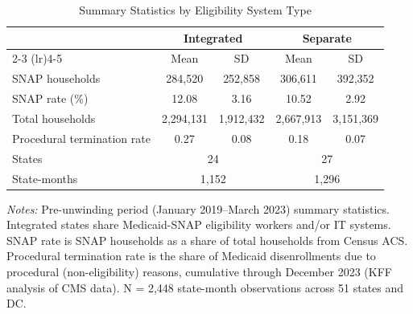 \begin{table}[H]
\centering
\caption{Summary Statistics by Eligibility System Type}
\label{tab:summary}
\begin{threeparttable}
\begin{tabular}{lcccc}
\toprule
 & \multicolumn{2}{c}{Integrated} & \multicolumn{2}{c}{Separate} \\
\cmidrule(lr){2-3} \cmidrule(lr){4-5}
 & Mean & SD & Mean & SD \\
\midrule
SNAP households & 284,520 & 252,858 & 306,611 & 392,352 \\
SNAP rate (\%) & 12.08 & 3.16 & 10.52 & 2.92 \\
Total households & 2,294,131 & 1,912,432 & 2,667,913 & 3,151,369 \\
Procedural termination rate & 0.27 & 0.08 & 0.18 & 0.07 \\
\midrule
States & \multicolumn{2}{c}{24} & \multicolumn{2}{c}{27} \\
State-months & \multicolumn{2}{c}{1,152} & \multicolumn{2}{c}{1,296} \\
\bottomrule
\end{tabular}
\begin{tablenotes}[flushleft]
\small
\item \textit{Notes:} Pre-unwinding period (January 2019--March 2023) summary statistics. 
Integrated states share Medicaid-SNAP eligibility workers and/or IT systems. 
SNAP rate is SNAP households as a share of total households from Census ACS. 
Procedural termination rate is the share of Medicaid disenrollments due to procedural 
(non-eligibility) reasons, cumulative through December 2023 (KFF analysis of CMS data). 
N = 2,448 state-month observations across 51 states and DC.
\end{tablenotes}
\end{threeparttable}
\end{table}
